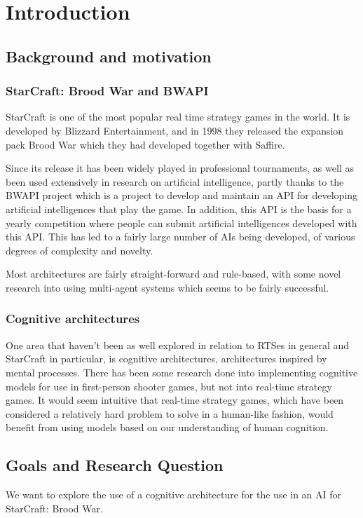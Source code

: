 
\chapter{Introduction}

\section{Background and motivation}
\subsection{StarCraft: Brood War and BWAPI}
StarCraft is one of the most popular real time strategy games in the world. It
is developed by Blizzard Entertainment, and in 1998 they released the expansion
pack Brood War which they had developed together with Saffire.

Since its release it has been widely played in professional tournaments, as
well as been used extensively in research on artificial intelligence, partly
thanks to the BWAPI project which is a project to develop and maintain an API
for developing artificial intelligences that play the game. In addition, this
API is the basis for a yearly competition where people can submit artificial
intelligences developed with this API. This has led to a fairly large number of
AIs being developed, of various degrees of complexity and novelty.

Most architectures are fairly straight-forward and rule-based, with some
novel research into using multi-agent systems which seems to be fairly
successful.

\subsection{Cognitive architectures}
One area that haven't been as well explored in relation to RTSes in general and
StarCraft in particular, is cognitive architectures, architectures inspired by
mental processes. There has been some research done into implementing cognitive
models for use in first-person shooter games, but not into real-time strategy
games. It would seem intuitive that real-time strategy games, which have been
considered a relatively hard problem to solve in a human-like fashion, would
benefit from using models based on our understanding of human cognition.


\section{Goals and Research Question}
We want to explore the use of a cognitive architecture for the use in an AI for
StarCraft: Brood War.

